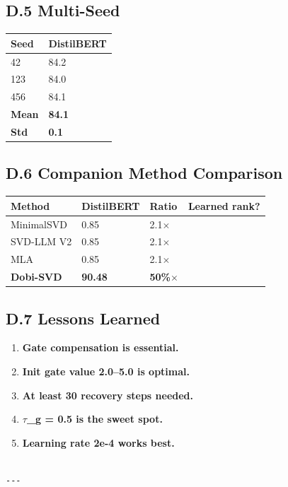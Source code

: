 \subsection{D.5 Multi-Seed}

\begin{table}[H]
\centering
\small
\begin{tabular}{ll}
\toprule
\textbf{Seed} & \textbf{DistilBERT} \\
\midrule
42 & 84.2 \\
123 & 84.0 \\
456 & 84.1 \\
\textbf{Mean} & \textbf{84.1} \\
\textbf{Std} & \textbf{0.1} \\
\bottomrule
\end{tabular}
\end{table}

\subsection{D.6 Companion Method Comparison}

\begin{table}[H]
\centering
\small
\begin{tabular}{llll}
\toprule
\textbf{Method} & \textbf{DistilBERT} & \textbf{Ratio} & \textbf{Learned rank?} \\
\midrule
MinimalSVD & 0.85 & 2.1$\times$ &  \\
SVD-LLM V2 & 0.85 & 2.1$\times$ &  \\
MLA & 0.85 & 2.1$\times$ &  \\
\textbf{Dobi-SVD} & \textbf{90.48} & \textbf{50\%$\times$} & \textbf{ } \\
\bottomrule
\end{tabular}
\end{table}

\subsection{D.7 Lessons Learned}

\begin{enumerate}
\item \textbf{Gate compensation is essential.}
\item \textbf{Init gate value 2.0--5.0 is optimal.}
\item \textbf{At least 30 recovery steps needed.}
\item \textbf{$\tau$\_g = 0.5 is the sweet spot.}
\item \textbf{Learning rate 2e-4 works best.}
\end{enumerate}
\begin{lstlisting}

---
\end{lstlisting}


